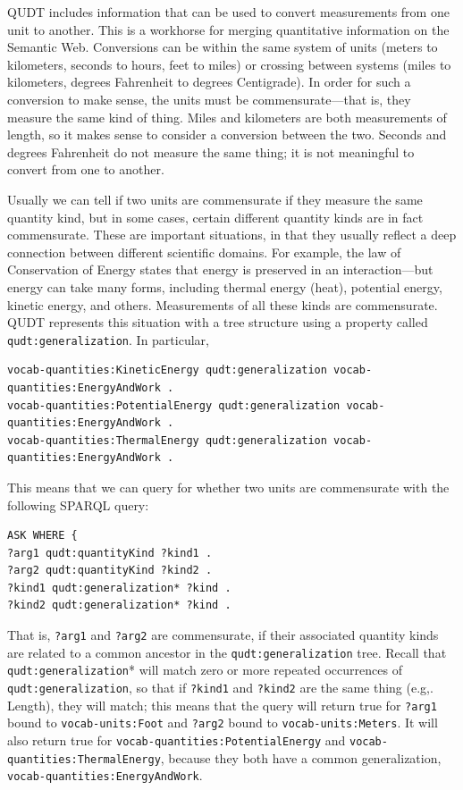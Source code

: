 QUDT includes information that can be used to convert measurements from
one unit to another. This is a workhorse for merging quantitative
information on the Semantic Web. Conversions can be within the same
system of units (meters to kilometers, seconds to hours, feet to miles)
or crossing between systems (miles to kilometers, degrees Fahrenheit to
degrees Centigrade). In order for such a conversion to make sense, the
units must be commensurate---that is, they measure the same kind of
thing. Miles and kilometers are both measurements of length, so it makes
sense to consider a conversion between the two. Seconds and degrees
Fahrenheit do not measure the same thing; it is not meaningful to
convert from one to another.

Usually we can tell if two units are commensurate if they measure the
same quantity kind, but in some cases, certain different quantity kinds
are in fact commensurate. These are important situations, in that they
usually reflect a deep connection between different scientific domains.
For example, the law of Conservation of Energy states that energy is
preserved in an interaction---but energy can take many forms, including
thermal energy (heat), potential energy, kinetic energy, and others.
Measurements of all these kinds are commensurate. QUDT represents this
situation with a tree structure using a property called
\texttt{qudt:generalization}. In particular,

\begin{lstlisting}
vocab-quantities:KineticEnergy qudt:generalization vocab-quantities:EnergyAndWork .
vocab-quantities:PotentialEnergy qudt:generalization vocab-quantities:EnergyAndWork .
vocab-quantities:ThermalEnergy qudt:generalization vocab-quantities:EnergyAndWork .
\end{lstlisting}

This means that we can query for whether two units are commensurate with
the following SPARQL
query:

\begin{lstlisting}
ASK WHERE {
?arg1 qudt:quantityKind ?kind1 .
?arg2 qudt:quantityKind ?kind2 .
?kind1 qudt:generalization* ?kind .
?kind2 qudt:generalization* ?kind .
\end{lstlisting}

That is, \texttt{?arg1} and \texttt{?arg2} are commensurate, if their associated quantity
kinds are related to a common ancestor in the \texttt{qudt:generalization} tree.
Recall that \texttt{qudt:generalization}* will match zero or more repeated
occurrences of \texttt{qudt:generalization}, so that if \texttt{?kind1} and \texttt{?kind2} are the
same thing (e.g,. Length), they will match; this means that the query
will return true for \texttt{?arg1} bound to \texttt{vocab-units:Foot} and \texttt{?arg2} bound to
\texttt{vocab-units:Meters}. It will also return true for
\texttt{vocab-quantities:PotentialEnergy} and \texttt{vocab-quantities:ThermalEnergy},
because they both have a common generalization,
\texttt{vocab-quantities:EnergyAndWork}.

